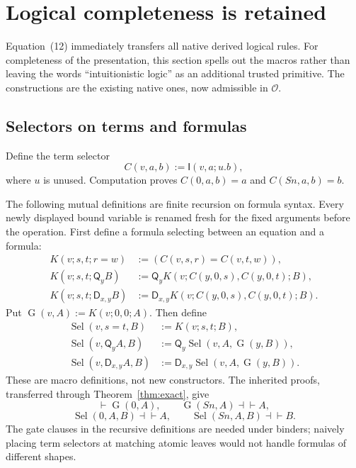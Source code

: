 \documentclass[11pt,letterpaper]{article}
\theoremstyle{definition}\newtheorem{definition}[theorem]{Definition}
\theoremstyle{remark}\newtheorem{remark}[theorem]{Remark}
\newcommand{\Ocal}{\mathcal O}
\newcommand{\Q}{\mathsf Q}
\newcommand{\D}{\mathsf D}
\newcommand{\I}{\mathsf I}
\newcommand{\Sel}{\operatorname{Sel}}
\newcommand{\Gate}{\operatorname{G}}
\begin{document}
\section{Logical completeness is retained}
\label{sec:logic}
Equation~(12) immediately transfers all native derived logical rules.
For completeness of the presentation, this section spells out the
macros rather than leaving the words ``intuitionistic logic'' as an
additional trusted primitive. The constructions are the existing native
ones, now admissible in \(\Ocal\).\cite{gates,logic}

\subsection{Selectors on terms and formulas}
Define the term selector
\[
 C(v,a,b):=\I(v,a;u.b),
\]
where \(u\) is unused. Computation proves
\(C(0,a,b)=a\) and \(C(Sn,a,b)=b\).

The following mutual definitions are finite recursion on formula syntax.
Every newly displayed bound variable is renamed fresh for the fixed
arguments before the operation. First define a formula selecting between
an equation and a formula:
\begin{align*}
 K(v;s,t;r=w)&:=(C(v,s,r)=C(v,t,w)),\\
 K(v;s,t;\Q_yB)&:=\Q_y K(v;C(y,0,s),C(y,0,t);B),\\
 K(v;s,t;\D_{x,y}B)&:=\D_{x,y}
                       K(v;C(y,0,s),C(y,0,t);B).
\end{align*}
Put \(\Gate(v,A):=K(v;0,0;A)\). Then define
\begin{align*}
 \Sel(v,s=t,B)&:=K(v;s,t;B),\\
 \Sel(v,\Q_y A,B)&:=\Q_y\Sel(v,A,\Gate(y,B)),\\
 \Sel(v,\D_{x,y} A,B)&:=\D_{x,y}\Sel(v,A,\Gate(y,B)).
\end{align*}
These are macro definitions, not new constructors. The inherited proofs,
transferred through Theorem~\ref{thm:exact}, give
\[
 \vdash\Gate(0,A),\qquad
 \Gate(Sn,A)\dashv\vdash A,
\]
\[
 \Sel(0,A,B)\dashv\vdash A,\qquad
 \Sel(Sn,A,B)\dashv\vdash B.
\]
The gate clauses in the recursive definitions are needed under binders;
naively placing term selectors at matching atomic leaves would not
handle formulas of different shapes.
\end{document}

